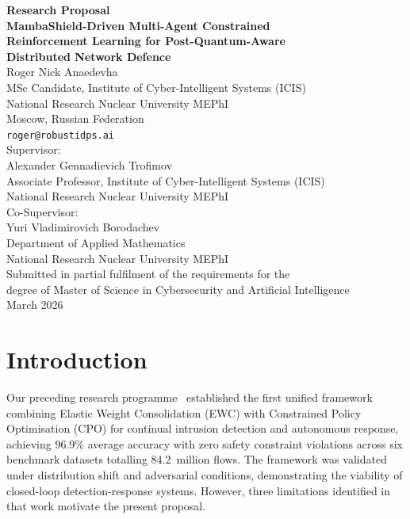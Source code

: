 \documentclass[12pt,a4paper]{article}
\theoremstyle{definition}
\begin{document}
\begin{titlepage}
\begin{center}
\vspace*{2cm}
{\LARGE\bfseries Research Proposal}\\[12pt]
{\Large\bfseries MambaShield-Driven Multi-Agent Constrained\\[4pt]
Reinforcement Learning for Post-Quantum-Aware\\[4pt]
Distributed Network Defence}\\[30pt]
{\large Roger Nick Anaedevha}\\[4pt]
{\normalsize MSc Candidate, Institute of Cyber-Intelligent Systems (ICIS)\\
National Research Nuclear University MEPhI\\
Moscow, Russian Federation\\
\texttt{roger@robustidps.ai}}\\[20pt]
{\large Supervisor:}\\[4pt]
{\normalsize Alexander Gennadievich Trofimov\\
Associate Professor, Institute of Cyber-Intelligent Systems (ICIS)\\
National Research Nuclear University MEPhI}\\[20pt]
{\large Co-Supervisor:}\\[4pt]
{\normalsize Yuri Vladimirovich Borodachev\\
Department of Applied Mathematics\\
National Research Nuclear University MEPhI}\\[30pt]
{\normalsize Submitted in partial fulfilment of the requirements for the\\
degree of Master of Science in Cybersecurity and Artificial Intelligence}\\[20pt]
{\normalsize March 2026}
\end{center}
\end{titlepage}

\tableofcontents
\newpage

\section{Introduction}
\label{sec:intro}

Our preceding research programme~\cite{anaedevha2026cl_rl} established the first unified framework combining Elastic Weight Consolidation (EWC) with Constrained Policy Optimisation (CPO) for continual intrusion detection and autonomous response, achieving 96.9\% average accuracy with zero safety constraint violations across six benchmark datasets totalling 84.2~million flows. The framework was validated under distribution shift and adversarial conditions, demonstrating the viability of closed-loop detection-response systems. However, three limitations identified in that work motivate the present proposal.
\end{document}
